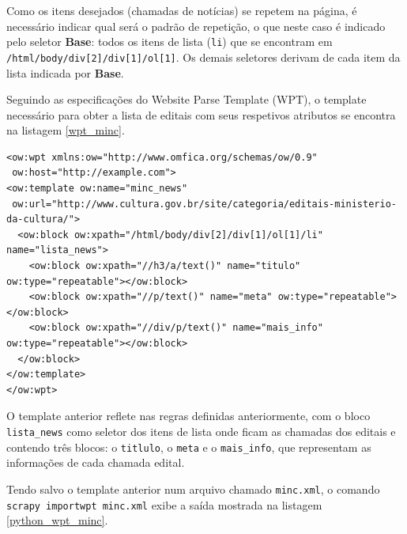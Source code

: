 Como os itens desejados (chamadas de notícias) se repetem na página, é necessário indicar qual será o padrão de repetição, o que neste caso é indicado pelo seletor \textbf{Base}: todos os itens de lista (\texttt{li}) que se encontram em \texttt{/html/body/div[2]/div[1]/ol[1]}. Os demais seletores derivam de cada item da lista indicada por \textbf{Base}.

Seguindo as especificações do Website Parse Template (WPT), o template necessário para obter a lista de editais com seus respetivos atributos se encontra na listagem \ref{wpt_minc}.

\begin{lstlisting}[label=wpt_minc]
<ow:wpt xmlns:ow="http://www.omfica.org/schemas/ow/0.9"
 ow:host="http://example.com">
<ow:template ow:name="minc_news" 
 ow:url="http://www.cultura.gov.br/site/categoria/editais-ministerio-da-cultura/">
  <ow:block ow:xpath="/html/body/div[2]/div[1]/ol[1]/li" name="lista_news">
    <ow:block ow:xpath="//h3/a/text()" name="titulo" ow:type="repeatable"></ow:block>
    <ow:block ow:xpath="//p/text()" name="meta" ow:type="repeatable"></ow:block>
    <ow:block ow:xpath="//div/p/text()" name="mais_info" ow:type="repeatable"></ow:block>
  </ow:block>
</ow:template> 
</ow:wpt>
\end{lstlisting}

O template anterior reflete nas regras definidas anteriormente, com o bloco \texttt{lista\_news} como seletor dos itens de lista onde ficam as chamadas dos editais e contendo três blocos: o \texttt{titlulo}, o \texttt{meta} e o \texttt{mais\_info}, que representam as informações de cada chamada edital.

Tendo salvo o template anterior num arquivo chamado \texttt{minc.xml}, o comando \texttt{scrapy importwpt minc.xml} exibe a saída mostrada na listagem \ref{python_wpt_minc}.

